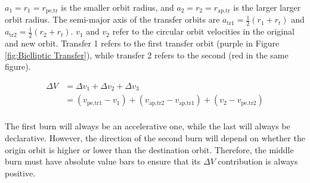 \documentclass[../main.tex]{subfiles}
\begin{document}
$a_1=r_1=r_\text{pe,tr}$ is the smaller orbit radius, and $a_2=r_2=r_\text{ap,tr}$ is the larger larger orbit radius. The semi-major axis of the transfer orbits are $a_\text{tr1}=\frac{1}{2}(r_1+r_t)$ and $a_\text{tr2}=\frac{1}{2}(r_2+r_t)$. $v_1$ and $v_2$ refer to the circular orbit velocities in the original and new orbit. Transfer 1 refers to the first transfer orbit (purple in Figure \ref{fig:Bielliptic Transfer}), while transfer 2 refers to the second (red in the same figure).

\begin{align*}
    \Delta V & = \Delta v_1+\Delta v_2+\Delta v_3                                              \\
             & = (v_\text{pe,tr1}-v_1)+(v_\text{ap,tr2}-v_\text{ap,tr1})+(v_2-v_\text{pe,tr2}) \\
\end{align*}

The first burn will always be an accelerative one, while the last will always be declarative. However, the direction of the second burn will depend on whether the origin orbit is higher or lower than the destination orbit. Therefore, the middle burn must have absolute value bars to ensure that its $\Delta V$ contribution is always positive.
\end{document}
